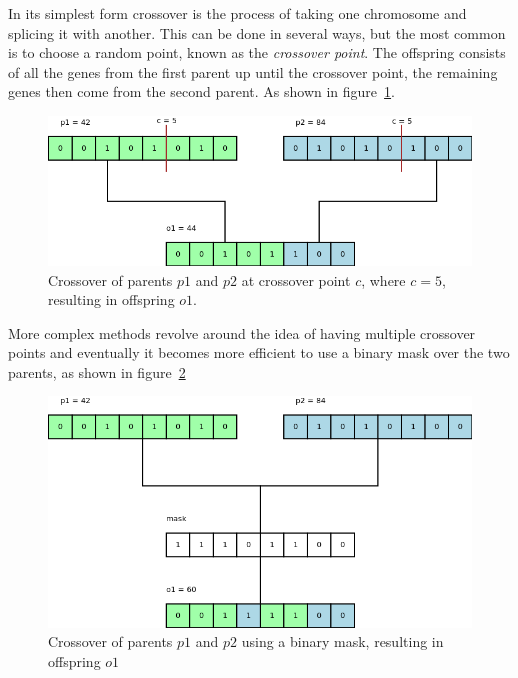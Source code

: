 \documentclass[10pt, a4paper]{article}
\begin{document}
In its simplest form crossover is the process of taking one chromosome and
splicing it with another. This can be done in several ways, but the most common
is to choose a random point, known as the \textit{crossover point}. The
offspring consists of all the genes from the first parent up until the 
crossover point, the remaining genes then come from the second parent. As shown
in figure~\ref{fig:crossover-point}.

\begin{figure}[h]
\centering
\includegraphics[scale=0.45]{img/crossover.png}
\caption{Crossover of parents $p1$ and $p2$ at crossover point $c$, where 
         $c=5$, resulting in offspring $o1$.} 
\label{fig:crossover-point}
\end{figure}

More complex methods revolve around the idea of having multiple crossover 
points and eventually it becomes more efficient to use a binary mask over
the two parents, as shown in figure~\ref{fig:crossover-mask}

\begin{figure}[h]
\includegraphics[scale=0.45]{img/mask-crossover.png}
\caption{Crossover of parents $p1$ and $p2$ using a binary mask, resulting in
         offspring $o1$}
\label{fig:crossover-mask}
\end{figure}
\end{document}

